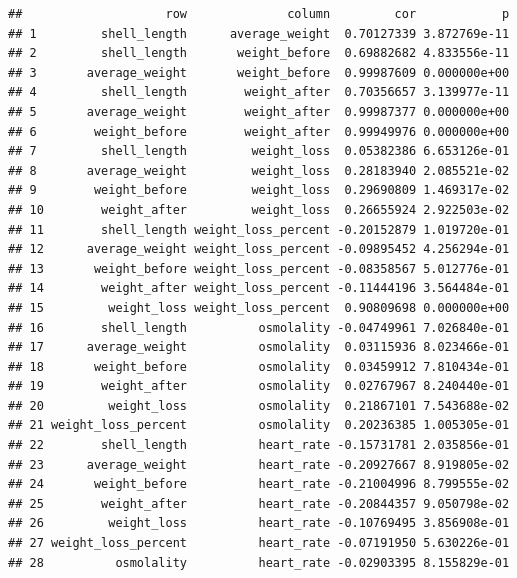 \documentclass[
]{article}
\newenvironment{Shaded}{\begin{snugshade}}{\end{snugshade}}
\newcommand{\FunctionTok}[1]{\textcolor[rgb]{0.00,0.00,0.00}{#1}}
\newcommand{\NormalTok}[1]{#1}
\newcommand{\OtherTok}[1]{\textcolor[rgb]{0.56,0.35,0.01}{#1}}
\newcommand{\SpecialCharTok}[1]{\textcolor[rgb]{0.00,0.00,0.00}{#1}}
\begin{document}
\begin{Shaded}
\end{Shaded}

\begin{verbatim}
##                    row              column         cor            p
## 1         shell_length      average_weight  0.70127339 3.872769e-11
## 2         shell_length       weight_before  0.69882682 4.833556e-11
## 3       average_weight       weight_before  0.99987609 0.000000e+00
## 4         shell_length        weight_after  0.70356657 3.139977e-11
## 5       average_weight        weight_after  0.99987377 0.000000e+00
## 6        weight_before        weight_after  0.99949976 0.000000e+00
## 7         shell_length         weight_loss  0.05382386 6.653126e-01
## 8       average_weight         weight_loss  0.28183940 2.085521e-02
## 9        weight_before         weight_loss  0.29690809 1.469317e-02
## 10        weight_after         weight_loss  0.26655924 2.922503e-02
## 11        shell_length weight_loss_percent -0.20152879 1.019720e-01
## 12      average_weight weight_loss_percent -0.09895452 4.256294e-01
## 13       weight_before weight_loss_percent -0.08358567 5.012776e-01
## 14        weight_after weight_loss_percent -0.11444196 3.564484e-01
## 15         weight_loss weight_loss_percent  0.90809698 0.000000e+00
## 16        shell_length          osmolality -0.04749961 7.026840e-01
## 17      average_weight          osmolality  0.03115936 8.023466e-01
## 18       weight_before          osmolality  0.03459912 7.810434e-01
## 19        weight_after          osmolality  0.02767967 8.240440e-01
## 20         weight_loss          osmolality  0.21867101 7.543688e-02
## 21 weight_loss_percent          osmolality  0.20236385 1.005305e-01
## 22        shell_length          heart_rate -0.15731781 2.035856e-01
## 23      average_weight          heart_rate -0.20927667 8.919805e-02
## 24       weight_before          heart_rate -0.21004996 8.799555e-02
## 25        weight_after          heart_rate -0.20844357 9.050798e-02
## 26         weight_loss          heart_rate -0.10769495 3.856908e-01
## 27 weight_loss_percent          heart_rate -0.07191950 5.630226e-01
## 28          osmolality          heart_rate -0.02903395 8.155829e-01
\end{verbatim}
\end{document}
